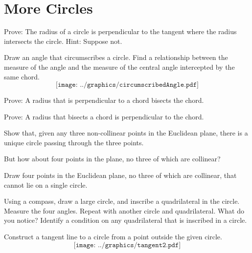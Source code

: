 \newpage

\section{More Circles}

\begin{prob}
Prove: The radius of a circle is perpendicular to the tangent where the radius intersects the circle.  Hint:  Suppose not. 
\end{prob}

\begin{prob}
Draw an angle that circumscribes a circle.  Find a relationship between the measure of the angle and the measure of the central angle intercepted by the same chord.
$$\texttt{[image: ../graphics/circumscribedAngle.pdf]}$$
\end{prob}

\begin{prob}
Prove: A radius that is perpendicular to a chord bisects the chord. 
\end{prob}

\begin{prob}
Prove:  A radius that bisects a chord is perpendicular to the chord. 
\end{prob}

\begin{prob}
Show that, given any three non-collinear points in the Euclidean
plane, there is a unique circle passing through the three points.
\end{prob}

But how about four points in the plane, no three of which are collinear?

\begin{prob}
Draw four points in the Euclidean plane, no three of which are collinear, that cannot lie on a single circle.
\end{prob}

\begin{prob}
Using a compass, draw a large circle, and inscribe a quadrilateral in the circle.  Measure the four angles.  Repeat with another circle and quadrilateral.  What do you notice?  Identify a condition on any quadrilateral that is inscribed in a circle.  
\end{prob}

\begin{prob}
Construct a tangent line to a circle from a point outside the given circle.
$$\texttt{[image: ../graphics/tangent2.pdf]}$$
\end{prob}

